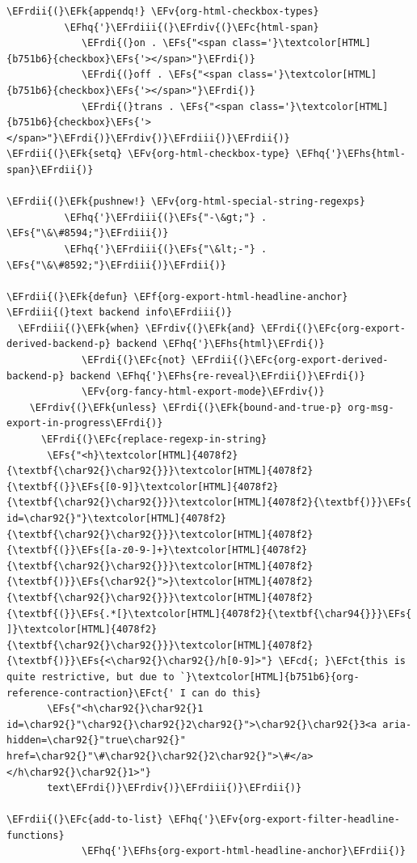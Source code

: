 \documentclass{scrartcl}
\newcommand{\EFk}[1]{\textcolor{EFk}{#1}} %
\newcommand{\EFs}[1]{\textcolor{EFs}{#1}} %
\newcommand{\EFct}[1]{\textcolor{EFct}{#1}} %
\newcommand{\EFc}[1]{\textcolor{EFc}{#1}} %
\newcommand{\EFv}[1]{\textcolor{EFv}{#1}} %
\newcommand{\EFf}[1]{\textcolor{EFf}{#1}} %
\newcommand{\EFcd}[1]{\textcolor{EFcd}{#1}} %
\newcommand{\EFhq}[1]{\textcolor{EFhq}{#1}} %
\newcommand{\EFhs}[1]{\textcolor{EFhs}{#1}} %
\newcommand{\EFrdi}[1]{\textcolor{EFrdi}{#1}} %
\newcommand{\EFrdii}[1]{\textcolor{EFrdii}{#1}} %
\newcommand{\EFrdiii}[1]{\textcolor{EFrdiii}{#1}} %
\newcommand{\EFrdiv}[1]{\textcolor{EFrdiv}{#1}} %
\begin{document}
\begin{Code}
\begin{Verbatim}[]
\EFrdii{(}\EFk{appendq!} \EFv{org-html-checkbox-types}
          \EFhq{'}\EFrdiii{(}\EFrdiv{(}\EFc{html-span}
             \EFrdi{(}on . \EFs{"<span class='}\textcolor[HTML]{b751b6}{checkbox}\EFs{'></span>"}\EFrdi{)}
             \EFrdi{(}off . \EFs{"<span class='}\textcolor[HTML]{b751b6}{checkbox}\EFs{'></span>"}\EFrdi{)}
             \EFrdi{(}trans . \EFs{"<span class='}\textcolor[HTML]{b751b6}{checkbox}\EFs{'></span>"}\EFrdi{)}\EFrdiv{)}\EFrdiii{)}\EFrdii{)}
\EFrdii{(}\EFk{setq} \EFv{org-html-checkbox-type} \EFhq{'}\EFhs{html-span}\EFrdii{)}

\EFrdii{(}\EFk{pushnew!} \EFv{org-html-special-string-regexps}
          \EFhq{'}\EFrdiii{(}\EFs{"-\&gt;"} . \EFs{"\&\#8594;"}\EFrdiii{)}
          \EFhq{'}\EFrdiii{(}\EFs{"\&lt;-"} . \EFs{"\&\#8592;"}\EFrdiii{)}\EFrdii{)}

\EFrdii{(}\EFk{defun} \EFf{org-export-html-headline-anchor} \EFrdiii{(}text backend info\EFrdiii{)}
  \EFrdiii{(}\EFk{when} \EFrdiv{(}\EFk{and} \EFrdi{(}\EFc{org-export-derived-backend-p} backend \EFhq{'}\EFhs{html}\EFrdi{)}
             \EFrdi{(}\EFc{not} \EFrdii{(}\EFc{org-export-derived-backend-p} backend \EFhq{'}\EFhs{re-reveal}\EFrdii{)}\EFrdi{)}
             \EFv{org-fancy-html-export-mode}\EFrdiv{)}
    \EFrdiv{(}\EFk{unless} \EFrdi{(}\EFk{bound-and-true-p} org-msg-export-in-progress\EFrdi{)}
      \EFrdi{(}\EFc{replace-regexp-in-string}
       \EFs{"<h}\textcolor[HTML]{4078f2}{\textbf{\char92{}\char92{}}}\textcolor[HTML]{4078f2}{\textbf{(}}\EFs{[0-9]}\textcolor[HTML]{4078f2}{\textbf{\char92{}\char92{}}}\textcolor[HTML]{4078f2}{\textbf{)}}\EFs{ id=\char92{}"}\textcolor[HTML]{4078f2}{\textbf{\char92{}\char92{}}}\textcolor[HTML]{4078f2}{\textbf{(}}\EFs{[a-z0-9-]+}\textcolor[HTML]{4078f2}{\textbf{\char92{}\char92{}}}\textcolor[HTML]{4078f2}{\textbf{)}}\EFs{\char92{}">}\textcolor[HTML]{4078f2}{\textbf{\char92{}\char92{}}}\textcolor[HTML]{4078f2}{\textbf{(}}\EFs{.*[}\textcolor[HTML]{4078f2}{\textbf{\char94{}}}\EFs{ ]}\textcolor[HTML]{4078f2}{\textbf{\char92{}\char92{}}}\textcolor[HTML]{4078f2}{\textbf{)}}\EFs{<\char92{}\char92{}/h[0-9]>"} \EFcd{; }\EFct{this is quite restrictive, but due to `}\textcolor[HTML]{b751b6}{org-reference-contraction}\EFct{' I can do this}
       \EFs{"<h\char92{}\char92{}1 id=\char92{}"\char92{}\char92{}2\char92{}">\char92{}\char92{}3<a aria-hidden=\char92{}"true\char92{}" href=\char92{}"\#\char92{}\char92{}2\char92{}">\#</a> </h\char92{}\char92{}1>"}
       text\EFrdi{)}\EFrdiv{)}\EFrdiii{)}\EFrdii{)}

\EFrdii{(}\EFc{add-to-list} \EFhq{'}\EFv{org-export-filter-headline-functions}
             \EFhq{'}\EFhs{org-export-html-headline-anchor}\EFrdii{)}


\end{Verbatim}
\end{Code}
\end{document}

